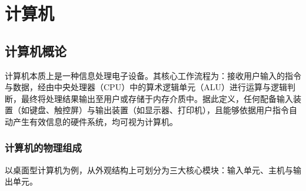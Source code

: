 \documentclass[12pt,UTF8]{ctexbook}
\begin{document}
%

\part{计算机}

\chapter{计算机概论}

计算机本质上是一种信息处理电子设备。其核心工作流程为：接收用户输入的指令与数据，经由中央处理器（CPU）中的算术逻辑单元（ALU）进行运算与逻辑判断，最终将处理结果输出至用户或存储于内存介质中。据此定义，任何配备输入装置（如键盘、触控屏）与输出装置（如显示器、打印机），且能够依据用户指令自动产生有效信息的硬件系统，均可视为计算机。

\section{计算机的物理组成}

以桌面型计算机为例，从外观结构上可划分为三大核心模块：输入单元、主机与输出单元。
\end{document}
